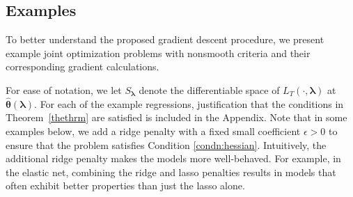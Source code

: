 \documentclass[12pt]{article}
\begin{document}
\begin{algorithm}[t]
\begin{spacing}{1.1}
\begin{algorithmic}
			\ENDFOR
		\end{algorithmic}
	\end{spacing}
\end{algorithm}

\subsection{Examples}\label{sec:examples}

To better understand the proposed gradient descent procedure, we present example joint optimization problems with nonsmooth criteria and their corresponding gradient calculations.

For ease of notation, we let $S_{\boldsymbol{\lambda}}$ denote the differentiable space of $L_T(\cdot, \boldsymbol{\lambda})$ at $\hat{\boldsymbol{\theta}}(\boldsymbol{\lambda})$. For each of the example regressions, justification that the conditions in Theorem~\ref{thethrm} are satisfied is included in the Appendix. Note that in some examples below, we add a ridge penalty with a fixed small coefficient $\epsilon > 0$ to ensure that the problem satisfies Condition \ref{condn:hessian}. Intuitively, the additional ridge penalty makes the models more well-behaved. For example, in the elastic net, combining the ridge and lasso penalties results in models that often exhibit better properties than just the lasso alone.
\end{document}
